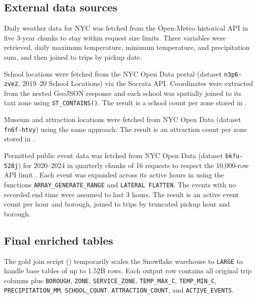 \documentclass[fleqn,moreauthors,9pt]{ds_report}
\begin{document}
\subsection*{External data sources}

Daily weather data for NYC was fetched from the Open-Meteo historical API \cite{openmeteo2024} in five 3-year chunks to stay within request size limits. Three variables were retrieved, daily maximum temperature, minimum temperature, and precipitation sum, and then joined to trips by pickup date.

School locations were fetched from the NYC Open Data portal (dataset \texttt{n3p6-zve2}, 2019--20 School Locations) via the Socrata API. Coordinates were extracted from the nested GeoJSON response and each school was spatially joined to its taxi zone using \texttt{ST\_CONTAINS()}. The result is a school count per zone stored in .

Museum and attraction locations were fetched from NYC Open Data (dataset \texttt{fn6f-htvy}) using the same approach. The result is an attraction count per zone stored in .

Permitted public event data was fetched from NYC Open Data (dataset \texttt{bkfu-528j}) for 2020--2024 in quarterly chunks of 16 requests to respect the 10,000-row API limit \cite{nycopen2024}. Each event was expanded across its active hours in  using the functions \texttt{ARRAY\_GENERATE\_RANGE} and \texttt{LATERAL FLATTEN}. The events with no recorded end time were assumed to last 3 hours. The result is an active event count per hour and borough, joined to trips by truncated pickup hour and borough.

\subsection*{Final enriched tables}

The gold join script () temporarily scales the Snowflake warehouse to \texttt{LARGE} to handle base tables of up to 1.52B rows. Each output row contains all original trip columns plus \texttt{BOROUGH}, \texttt{ZONE}, \texttt{SERVICE\_ZONE}, \texttt{TEMP\_MAX\_C}, \texttt{TEMP\_MIN\_C}, \\  \texttt{PRECIPITATION\_MM}, \texttt{SCHOOL\_COUNT}, \texttt{ATTRACTION\_COUNT}, and \texttt{ACTIVE\_EVENTS}.

\end{document}
